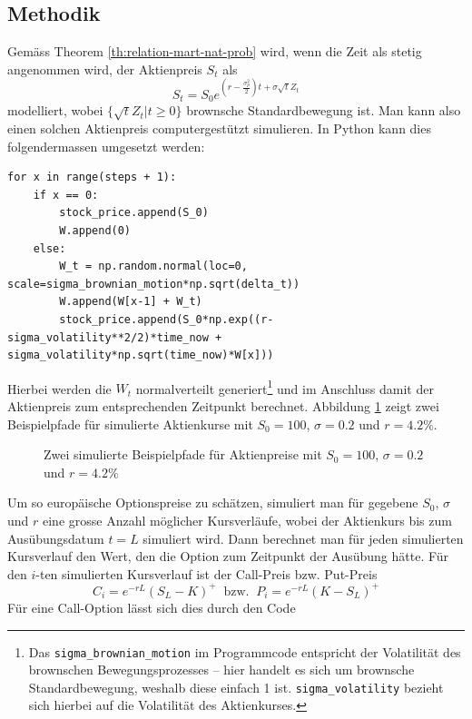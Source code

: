 \documentclass[11pt]{report} %
\begin{document}
\subsection{Methodik}
Gemäss Theorem \ref{th:relation-mart-nat-prob} wird, wenn die Zeit als stetig angenommen wird, der Aktienpreis $S_t$ als $$S_t=S_0e^{\left(r-\frac{\sigma_p^2}{2}\right)t+\sigma\sqrt{t}Z_t}$$ modelliert, wobei $\{\sqrt{t}Z_t|t\geq0\}$ brownsche Standardbewegung ist. Man kann also einen solchen Aktienpreis computergestützt simulieren. In Python kann dies folgendermassen umgesetzt werden:
\begin{lstlisting}
for x in range(steps + 1):
    if x == 0:
        stock_price.append(S_0)
        W.append(0)
    else:
        W_t = np.random.normal(loc=0, scale=sigma_brownian_motion*np.sqrt(delta_t))
        W.append(W[x-1] + W_t)
        stock_price.append(S_0*np.exp((r-sigma_volatility**2/2)*time_now + sigma_volatility*np.sqrt(time_now)*W[x]))
\end{lstlisting}
Hierbei werden die $W_t$ normalverteilt generiert\footnote{Das \texttt{sigma\_brownian\_motion} im Programmcode entspricht der Volatilität des brownschen Bewegungsprozesses -- hier handelt es sich um brownsche Standardbewegung, weshalb diese einfach 1 ist. \texttt{sigma\_volatility} bezieht sich hierbei auf die Volatilität des Aktienkurses.} und im Anschluss damit der Aktienpreis zum entsprechenden Zeitpunkt berechnet.
Abbildung \ref{fig:montecarlo-example} zeigt zwei Beispielpfade für simulierte Aktienkurse mit $S_0=100$, $\sigma=0.2$ und $r=4.2\%$.
\begin{figure}[H]
    \centering
    \caption{Zwei simulierte Beispielpfade für Aktienpreise mit $S_0=100$, $\sigma=0.2$ und $r=4.2\%$}
    \label{fig:montecarlo-example}
\end{figure}
Um so europäische Optionspreise zu schätzen, simuliert man für gegebene $S_0$, $\sigma$ und $r$ eine grosse Anzahl möglicher Kursverläufe, wobei der Aktienkurs bis zum Ausübungsdatum $t=L$ simuliert wird. Dann berechnet man für jeden simulierten Kursverlauf den Wert, den die Option zum Zeitpunkt der Ausübung hätte. Für den $i$-ten simulierten Kursverlauf ist der Call-Preis bzw. Put-Preis $$C_i=e^{-rL}(S_L-K)^+\ \text{ bzw. }\ P_i=e^{-rL}(K-S_L)^+$$ Für eine Call-Option lässt sich dies durch den Code 
\end{document}
